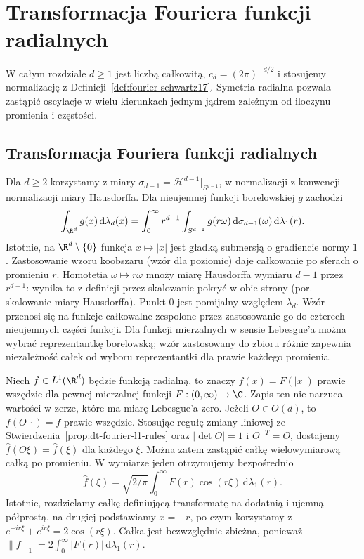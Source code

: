 \section{Transformacja Fouriera funkcji radialnych}
\providecommand{\atlasref}[2]{#2}

W całym rozdziale $d\ge1$ jest liczbą całkowitą,
$c_d=(2\pi)^{-d/2}$ i stosujemy normalizację z
Definicji~\ref{def:fourier-schwartz17}. Symetria radialna
pozwala zastąpić oscylacje w wielu kierunkach jednym
jądrem zależnym od iloczynu promienia i częstości.

\subsection{Transformacja Fouriera funkcji radialnych}

Dla $d\ge2$ korzystamy z miary
$\sigma_{d-1}=\mathcal H^{d-1}|_{S^{d-1}}$,
w normalizacji z \atlasref{ME-26::rem:hausdorff-convention-26}{konwencji normalizacji miary Hausdorffa}.
Dla nieujemnej funkcji borelowskiej $g$ zachodzi
\[
 \int_{\R^d}g(x)\,\mathrm d\lambda_d(x)
 =\int_0^\infty r^{d-1}
 \int_{S^{d-1}}g(r\omega)\,\mathrm d\sigma_{d-1}(\omega)
 \,\mathrm d\lambda_1(r).
\]
Istotnie, na $\R^d\setminus\{0\}$ funkcja $x\mapsto |x|$
jest gładką submersją o gradiencie normy $1$.
Zastosowanie wzoru koobszaru
(\atlasref{ME-28::cor:coarea-level-28}{wzór dla poziomic})
daje całkowanie po sferach o promieniu $r$.
Homotetia $\omega\mapsto r\omega$ mnoży miarę
Hausdorffa wymiaru $d-1$ przez $r^{d-1}$:
wynika to z definicji przez skalowanie pokryć w obie
strony (por. \atlasref{ME-26::thm:hausdorff-lipschitz-26}{skalowanie miary Hausdorffa}).
Punkt $0$ jest pomijalny względem $\lambda_d$.
Wzór przenosi się na funkcje całkowalne zespolone
przez zastosowanie go do czterech nieujemnych części
funkcji. Dla funkcji mierzalnych w sensie Lebesgue'a
można wybrać reprezentantkę borelowską; wzór zastosowany
do zbioru różnic zapewnia niezależność całek od wyboru
reprezentantki dla prawie każdego promienia.

Niech $f\in L^1(\R^d)$ będzie funkcją radialną,
to znaczy $f(x)=F(|x|)$ prawie wszędzie dla pewnej
mierzalnej funkcji $F:(0,\infty)\to\C$.
Zapis ten nie narzuca wartości w zerze, które ma
miarę Lebesgue'a zero. Jeżeli $O\in O(d)$, to
$f(O\,\cdot)=f$ prawie wszędzie. Stosując regułę
zmiany liniowej ze Stwierdzenia~\ref{prop:dt-fourier-l1-rules}
oraz $|\det O|=1$ i $O^{-T}=O$, dostajemy
$\widehat f(O\xi)=\widehat f(\xi)$ dla każdego $\xi$.
Można zatem zastąpić całkę wielowymiarową całką po
promieniu. W wymiarze jeden otrzymujemy bezpośrednio
\[
 \widehat f(\xi)=\sqrt{2/\pi}\int_0^\infty
 F(r)\cos(r\xi)\,\mathrm d\lambda_1(r).
\]
Istotnie, rozdzielamy całkę definiującą transformatę
na dodatnią i ujemną półprostą, na drugiej podstawiamy
$x=-r$, po czym korzystamy z
$e^{-ir\xi}+e^{ir\xi}=2\cos(r\xi)$.
Całka jest bezwzględnie zbieżna, ponieważ
$\|f\|_1=2\int_0^\infty|F(r)|\,\mathrm d\lambda_1(r)$.

